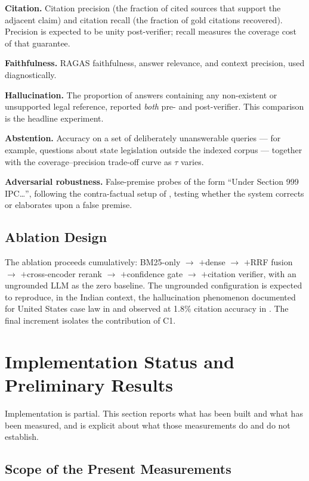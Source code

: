\documentclass[conference]{IEEEtran}
\begin{document}
\textbf{Citation.} Citation precision (the fraction of cited sources that support the adjacent claim) and citation recall (the fraction of gold citations recovered). Precision is expected to be unity post-verifier; recall measures the coverage cost of that guarantee.

\textbf{Faithfulness.} RAGAS \cite{es2023} faithfulness, answer relevance, and context precision, used diagnostically.

\textbf{Hallucination.} The proportion of answers containing any non-existent or unsupported legal reference, reported \emph{both} pre- and post-verifier. This comparison is the headline experiment.

\textbf{Abstention.} Accuracy on a set of deliberately unanswerable queries — for example, questions about state legislation outside the indexed corpus — together with the coverage--precision trade-off curve as $\tau$ varies.

\textbf{Adversarial robustness.} False-premise probes of the form ``Under Section 999 IPC\ldots'', following the contra-factual setup of \cite{dahl2024}, testing whether the system corrects or elaborates upon a false premise.

\subsection{Ablation Design}

The ablation proceeds cumulatively: BM25-only $\rightarrow$ $+$dense $\rightarrow$ $+$RRF fusion $\rightarrow$ $+$cross-encoder rerank $\rightarrow$ $+$confidence gate $\rightarrow$ $+$citation verifier, with an ungrounded LLM as the zero baseline. The ungrounded configuration is expected to reproduce, in the Indian context, the hallucination phenomenon documented for United States case law in \cite{dahl2024} and observed at 1.8\% citation accuracy in \cite{bindra2026}. The final increment isolates the contribution of C1.

\section{Implementation Status and Preliminary Results}
\label{sec:prelim}

Implementation is partial. This section reports what has been built and what
has been measured, and is explicit about what those measurements do and do not
establish.

\subsection{Scope of the Present Measurements}
\end{document}
